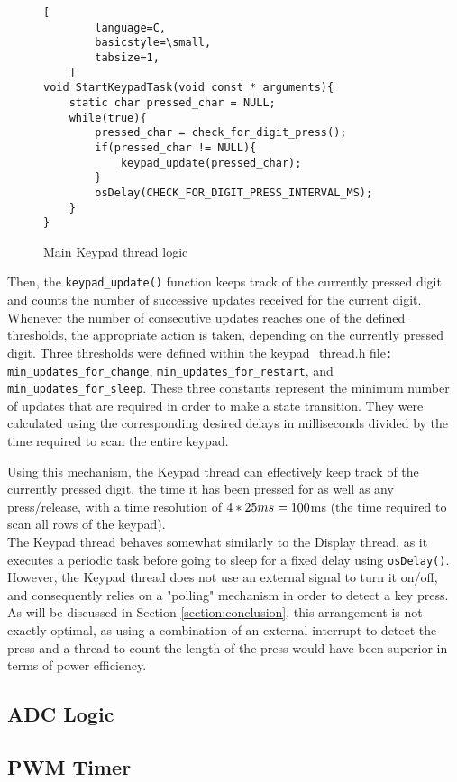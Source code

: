 \begin{figure}[h]
\begin{minipage}{0.45\textwidth}	
	\begin{lstlisting}[
		language=C,
		basicstyle=\small,
		tabsize=1,
	]
void StartKeypadTask(void const * arguments){
	static char pressed_char = NULL;
	while(true){
		pressed_char = check_for_digit_press();
		if(pressed_char != NULL){
			keypad_update(pressed_char);
		}
		osDelay(CHECK_FOR_DIGIT_PRESS_INTERVAL_MS);
	}
}
	\end{lstlisting}
	\caption{\label{fig:keypad-thread-main-logic}Main Keypad thread logic}
\end{minipage}
\end{figure}

Then, the \verb|keypad_update()| function keeps track of the currently pressed digit and counts the number of successive updates received for the current digit. Whenever the number of consecutive updates reaches one of the defined thresholds, the appropriate action is taken, depending on the currently pressed digit. Three thresholds were defined within the \href{https://github.com/lebrice/MicroP/blob/master/Lab4/Src/keypad_thread.h}{keypad\_thread.h} file\verb|:| \verb|min_updates_for_change|, \verb|min_updates_for_restart|, and \verb|min_updates_for_sleep|. These three constants represent the minimum number of updates that are required in order to make a state transition. They were calculated using the corresponding desired delays in milliseconds divided by the time required to scan the entire keypad.

Using this mechanism, the Keypad thread can effectively keep track of the currently pressed digit, the time it has been pressed for as well as any press/release, with a time resolution of $4*25ms = 100$ms (the time required to scan all rows of the keypad).\\

The Keypad thread behaves somewhat similarly to the Display thread, as it executes a periodic task before going to sleep for a fixed delay using \verb|osDelay()|. However, the Keypad thread does not use an external signal to turn it on/off, and consequently relies on a "polling" mechanism in order to detect a key press. As will be discussed in Section \ref{section:conclusion}, this arrangement is not exactly optimal, as using a combination of an external interrupt to detect the press and a thread to count the length of the press would have been superior in terms of power efficiency.



\subsection{ADC Logic}

\subsection{PWM Timer}